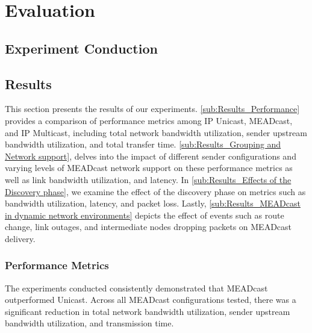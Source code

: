 \chapter{Evaluation} %
\label{chap:Evaluation}

\section{Experiment Conduction} %
\label{sec:Experiment Conduction}


\section{Results} %
\label{sec:Results}
This section presents the results of our experiments.
\autoref{sub:Results_Performance} provides a comparison of performance metrics among IP
    Unicast, MEADcast, and IP Multicast, including total network bandwidth
    utilization, sender upstream bandwidth utilization, and total transfer
    time.
\autoref{sub:Results_Grouping and Network support}, delves into the impact of different
    sender configurations and varying levels of MEADcast network support on
    these performance metrics as well as link bandwidth utilization, and
    latency.
In \autoref{sub:Results_Effects of the Discovery phase}, we examine the effect of the
    discovery phase on metrics such as bandwidth utilization, latency, and
    packet loss.
Lastly, \autoref{sub:Results_MEADcast in dynamic network environments} depicts the
    effect of events such as route change, link outages, and intermediate nodes
    dropping packets on MEADcast delivery.
\subsection{Performance Metrics} %
\label{sub:Results_Performance}
The experiments conducted consistently demonstrated that MEADcast outperformed
    Unicast.
Across all MEADcast configurations tested, there was a significant reduction in
    total network bandwidth utilization, sender upstream bandwidth utilization,
    and transmission time.

